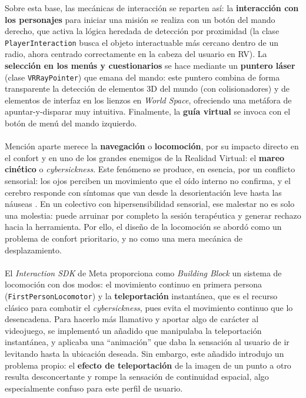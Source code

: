 \documentclass[12pt,twoside,titlepage]{report}
\begin{document}
Sobre esta base, las mecánicas de interacción se reparten así: la \textbf{interacción con los personajes} para iniciar una misión se realiza con un botón del mando derecho, que activa la lógica heredada de detección por proximidad (la clase \texttt{PlayerInteraction} busca el objeto interactuable más cercano dentro de un radio, ahora centrado correctamente en la cabeza del usuario en RV).
La \textbf{selección en los menús y cuestionarios} se hace mediante un \textbf{puntero láser} (clase \texttt{VRRayPointer}) que emana del mando: este puntero combina de forma transparente la detección de elementos 3D del mundo (con colisionadores) y de elementos de interfaz en los lienzos en \textit{World Space}, ofreciendo una metáfora de apuntar-y-disparar muy intuitiva.
Finalmente, la \textbf{guía virtual} se invoca con el botón de menú del mando izquierdo.\\
\\
Mención aparte merece la \textbf{navegación} o \textbf{locomoción}, por su impacto directo en el confort y en uno de los grandes enemigos de la Realidad Virtual: el \textbf{mareo cinético} o \textit{cybersickness}.
Este fenómeno se produce, en esencia, por un conflicto sensorial: los ojos perciben un movimiento que el oído interno no confirma, y el cerebro responde con síntomas que van desde la desorientación leve hasta las náuseas \parencite{laviola2000}.
En un colectivo con hipersensibilidad sensorial, ese malestar no es solo una molestia: puede arruinar por completo la sesión terapéutica y generar rechazo hacia la herramienta.
Por ello, el diseño de la locomoción se abordó como un problema de confort prioritario, y no como una mera mecánica de desplazamiento.\\
\\
El \textit{Interaction SDK} de Meta proporciona como \textit{Building Block} un sistema de locomoción con dos modos: el movimiento continuo en primera persona (\texttt{FirstPerson\hspace{0pt}Locomotor}) y la \textbf{teleportación} instantánea, que es el recurso clásico para combatir el \textit{cybersickness}, pues evita el movimiento continuo que lo desencadena.
Para hacerlo más llamativo y aportar algo de carácter al videojuego, se implementó un añadido que manipulaba la teleportación instantánea, y aplicaba una ``animación'' que daba la sensación al usuario de ir levitando hasta la ubicación deseada.
Sin embargo, este añadido introdujo un problema propio: el \textbf{efecto de teleportación} de la imagen de un punto a otro resulta desconcertante y rompe la sensación de continuidad espacial, algo especialmente confuso para este perfil de usuario.
\end{document}
